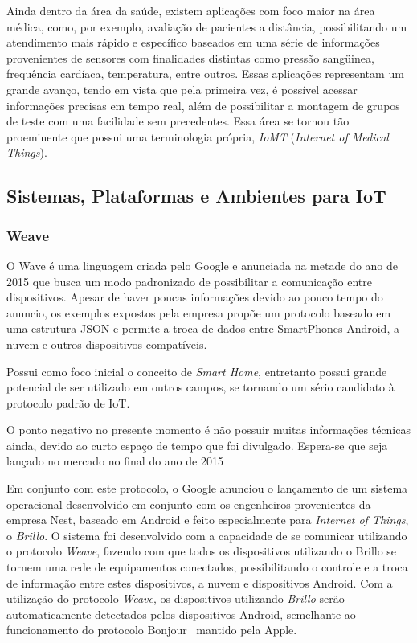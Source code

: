 Ainda dentro da área da saúde, existem aplicações com foco maior na área médica, como, por exemplo,
avaliação de pacientes a distância, possibilitando um atendimento mais rápido e específico baseados em uma
série de informações provenientes de sensores com finalidades distintas como pressão sangüinea,
frequência cardíaca, temperatura, entre outros. Essas aplicações representam um grande avanço, tendo
em vista que pela primeira vez, é possível acessar informações precisas em tempo real, além de possibilitar
a montagem de grupos de teste com uma facilidade sem precedentes. Essa área se tornou tão proeminente que
possui uma terminologia própria, \textit{IoMT} (\textit{Internet of Medical Things}).


\subsection{Sistemas, Plataformas e Ambientes para IoT}
\label{sec:IoTPlataformas}

\subsubsection{Weave}
O Wave é uma linguagem criada pelo Google e anunciada na metade do ano de 2015 que busca um modo padronizado
de possibilitar a comunicação entre dispositivos. Apesar de haver poucas informações devido ao pouco tempo
do anuncio, os exemplos expostos pela empresa propõe um protocolo baseado em uma estrutura JSON e permite a troca
de dados entre SmartPhones Android, a nuvem e outros dispositivos compatíveis.

Possui como foco inicial o conceito de \textit{Smart Home}, entretanto possui grande potencial de
ser utilizado em outros campos, se tornando um sério candidato à protocolo padrão de IoT.

O ponto negativo no presente momento é não possuir muitas informações técnicas ainda, devido ao
curto espaço de tempo que foi divulgado. Espera-se que seja lançado no mercado no final do ano de
2015

Em conjunto com este protocolo, o Google anunciou o lançamento de um sistema operacional desenvolvido em
conjunto com os engenheiros provenientes da empresa Nest, baseado em Android e feito especialmente para
\textit{Internet of Things}, o \textit{Brillo}. O sistema foi desenvolvido com a capacidade de se comunicar
utilizando o protocolo \textit{Weave}, fazendo com que todos os dispositivos utilizando o Brillo se tornem
uma rede de equipamentos conectados, possibilitando o controle e a troca de informação entre estes dispositivos,
a nuvem e dispositivos Android. Com a utilização do protocolo \textit{Weave}, os dispositivos utilizando \textit{Brillo}
serão automaticamente detectados pelos dispositivos Android, semelhante ao funcionamento do protocolo Bonjour~\cite{Bonjour}
mantido pela Apple.

